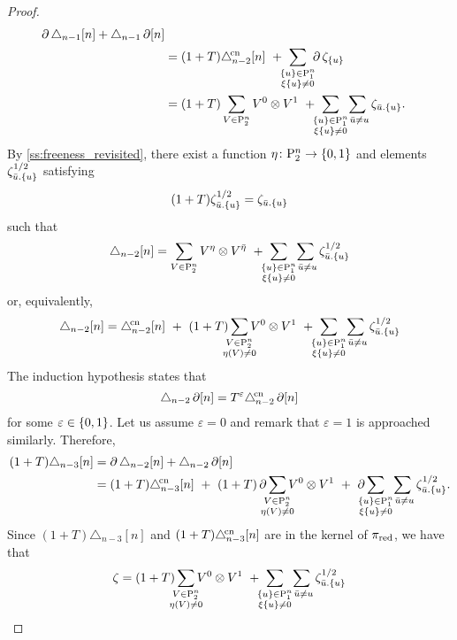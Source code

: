 \begin{proof}
\begin{align*}
		\bd\triangle_{n-1}[n] + \triangle_{n-1}\bd[n] \\ &=
		(1+T) \canonical_{n-2}[n] \ + \
		\sum_{\mathclap{\substack{\set{u} \in \P_1^n \\ \xi \set{u} \neq 0}}} \ \bd\zeta_{\set{u}} \\ &=
		(1+T)\sum_{V \in \P_2^n} V^0 \ot V^1 \ + \
		\sum_{\mathclap{\substack{\set{u} \in \P_1^n \\ \xi \set{u} \neq 0}}} \
		\sum_{\ \bar{u} \neq u} \zeta_{\bar{u}.\set{u}}.
	\end{align*}
	By \cref{ss:freeness_revisited}, there exist a function $\eta \colon \mathrm{P}^n_2 \to \{0,1\}$ and elements $\zeta^{1/2}_{\bar{u}.\{u\}}$ satisfying
	\[
	(1+T)\zeta^{1/2}_{\bar{u}.\{u\}} = \zeta_{\bar{u}.\{u\}}
	\]
	such that
	\[
	\triangle_{n-2}[n] =
	\sum_{V \in \P_{2}^n} V^\eta \ot V^\bareta \ + \
	\sum_{\mathclap{\substack{\set{u} \in \P_1^n \\ \xi \set{u} \neq 0}}} \
	\sum_{\ \bar{u} \neq u} \zeta^{1/2}_{\bar{u}.\set{u}}
	\]
	or, equivalently,
	\[
	\triangle_{n-2}[n] =
	\canonical_{n-2}[n] \ + \
	(1+T)\sum_{\mathclap{\substack{V \in \P_2^n \\ \eta(V) \neq 0}}} V^0 \ot V^1 \ + \
	\sum_{\mathclap{\substack{\set{u} \in \P_1^n \\ \xi \set{u} \neq 0}}} \
	\sum_{\ \bar{u} \neq u} \zeta^{1/2}_{\bar{u}.\set{u}}
	\]
	The induction hypothesis states that
	\[
	\triangle_{n-2} \operatorname{\partial}[n] = T^\varepsilon \triangle^{\!\mathrm{cn}}_{n-2} \operatorname{\partial}[n]
	\]
	for some $\varepsilon \in \{0,1\}$.
	Let us assume $\varepsilon = 0$ and remark that $\varepsilon = 1$ is approached similarly.
	Therefore,
	\begin{align*}
		(1+T)\triangle_{n-3}[n] &=
		\bd\triangle_{n-2}[n] + \triangle_{n-2}\bd[n] \\ &=
		(1+T)\canonical_{n-3}[n] \ + \
		(1+T)\bd\sum_{\mathclap{\substack{V \in \P_2^n \\ \eta(V) \neq 0}}} V^0 \ot V^1 \ + \
		\bd\sum_{\mathclap{\substack{\set{u} \in \P_1^n \\ \xi \set{u} \neq 0}}} \
		\sum_{\ \bar{u} \neq u} \zeta^{1/2}_{\bar{u}.\set{u}}.
	\end{align*}
	Since $(1+T)\triangle_{n-3}[n]$ and $(1+T)\triangle^{\!\mathrm{cn}}_{n-3}[n]$ are in the kernel of $\operatorname{\pi_{\text{red}}}$, we have that
	\[
	\zeta = (1+T)\sum_{\mathclap{\substack{V \in \P_2^n \\ \eta(V) \neq 0}}} V^0 \ot V^1 \ + \
	\sum_{\mathclap{\substack{\set{u} \in \P_1^n \\ \xi \set{u} \neq 0}}} \
	\sum_{\ \bar{u} \neq u} \zeta^{1/2}_{\bar{u}.\set{u}}
\]
\end{proof}
